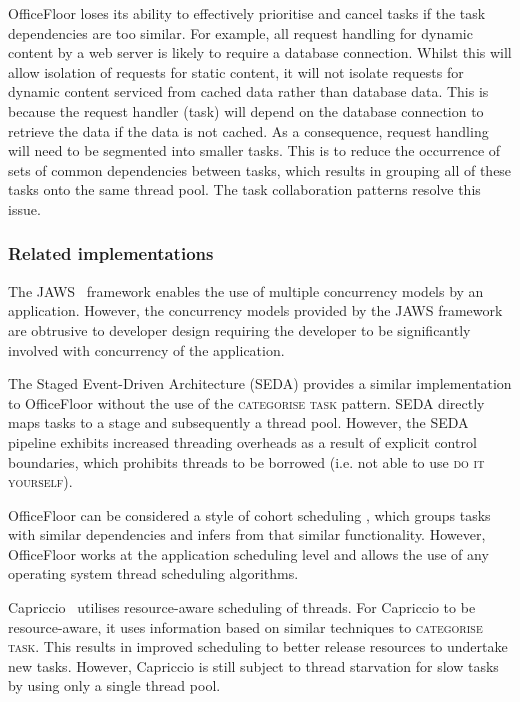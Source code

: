 \documentclass[prodmode]{style/acmlarge}
\begin{document}
OfficeFloor loses its ability to effectively prioritise and cancel tasks if the
task dependencies are too similar.  For example, all request handling for
dynamic content by a web server is likely to require a database connection.
Whilst this will allow isolation of requests for static content, it will not
isolate requests for dynamic content serviced from cached data rather than
database data.  This is because the request handler (task) will depend on the
database connection to retrieve the data if the data is not cached.  As a
consequence, request handling will need to be segmented into smaller tasks. 
This is to reduce the occurrence of sets of common dependencies between tasks,
which results in grouping all of these tasks onto the same thread pool.  The task
collaboration patterns resolve this issue.


\subsubsection*{Related implementations}

The JAWS~\cite{jaws} framework enables the use of multiple concurrency models by
an application.  However, the concurrency models provided by the JAWS framework
are obtrusive to developer design requiring the developer to be significantly
involved with concurrency of the application.

The Staged Event-Driven Architecture (SEDA) \cite{seda} provides a similar
implementation to OfficeFloor without the use of the \textsc{categorise task}
pattern.  SEDA directly maps tasks to a stage and subsequently a thread pool.
However, the SEDA pipeline exhibits increased threading overheads as a result of
explicit control boundaries, which prohibits threads to be borrowed (i.e. not
able to use \textsc{do it yourself}).

OfficeFloor can be considered a style of cohort scheduling \cite{cohort}, which
groups tasks with similar dependencies and infers from that similar
functionality.  However, OfficeFloor works at the application scheduling level
and allows the use of any operating system thread scheduling algorithms.

Capriccio~\cite{capriccio} utilises resource-aware scheduling of threads.  For
Capriccio to be resource-aware, it uses information based on similar techniques
to \textsc{categorise task}.  This results in improved scheduling to better
release resources to undertake new tasks.  However, Capriccio is still subject
to thread starvation for slow tasks by using only a single thread pool.
\end{document}
